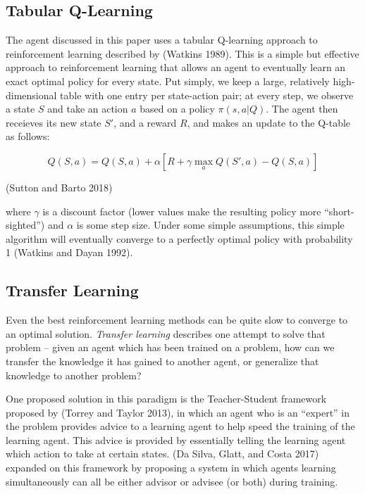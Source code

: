 \documentclass[twocolumn]{article}
\begin{document}
\hypertarget{tabular-q-learning}{\subsection{Tabular Q-Learning}\label{tabular-q-learning}}

The agent discussed in this paper uses a tabular Q-learning approach to
reinforcement learning described by (Watkins 1989). This is a simple but
effective approach to reinforcement learning that allows an agent to
eventually learn an exact optimal policy for every state. Put simply, we
keep a large, relatively high-dimensional table with one entry per
state-action pair; at every step, we observe a state \(S\) and take an
action \(a\) based on a policy \(\pi(s, a | Q)\). The agent then
receieves its new state \(S'\), and a reward \(R\), and makes an update
to the Q-table as follows:

\[
Q(S, a) = Q(S, a) + \alpha[R + \gamma \max_aQ(S', a) - Q(S, a)]
\]

(Sutton and Barto 2018)

where \(\gamma\) is a discount factor (lower values make the resulting
policy more ``short-sighted'') and \(\alpha\) is some step size. Under
some simple assumptions, this simple algorithm will eventually converge
to a perfectly optimal policy with probability 1 (Watkins and Dayan
1992).

\hypertarget{transfer-learning}{\subsection{Transfer Learning}\label{transfer-learning}}

Even the best reinforcement learning methods can be quite slow to
converge to an optimal solution. \emph{Transfer learning} describes one
attempt to solve that problem -- given an agent which has been trained
on a problem, how can we transfer the knowledge it has gained to another
agent, or generalize that knowledge to another problem?

One proposed solution in this paradigm is the Teacher-Student framework
proposed by (Torrey and Taylor 2013), in which an agent who is an
``expert'' in the problem provides advice to a learning agent to help
speed the training of the learning agent. This advice is provided by
essentially telling the learning agent which action to take at certain
states. (Da Silva, Glatt, and Costa 2017) expanded on this framework by
proposing a system in which agents learning simultaneously can all be
either advisor or advisee (or both) during training.
\end{document}
